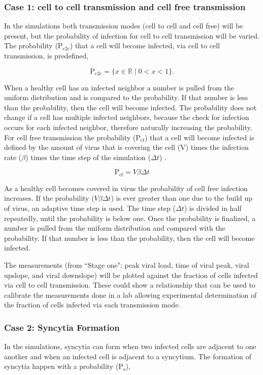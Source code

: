\documentclass[a4paper]{article}
\begin{document}
\subsubsection{Case 1: cell to cell transmission and cell free transmission}
In the simulations both transmission modes (cell to cell and cell free) will be present, but the probability of infection for cell to cell transmission will be varied. The probability ($\mathrm{P_{c2c}}$) that a cell will become infected, via cell to cell transmission, is predefined,

$$\mathrm{P_{c2c}} = \{x \in \mathbb{R} \mid 0<x<1\}.$$

\noindent
When a healthy cell has an infected neighbor a number is pulled from the uniform distribution and is compared to the probability. If that number is less than the probability, then the cell will become infected. The probability does not change if a cell has multiple infected neighbors, because the check for infection occurs for each infected neighbor, therefore naturally increasing the probability. For cell free transmission the probability ($\mathrm{P_{cf}}$) that a cell will become infected is defined by the amount of virus that is covering the cell (V) times the infection rate ($\beta$) times the time step of the simulation ($\Delta t$) \cite{Holder}.

$$\mathrm{P_{cf}} = V \beta \Delta t$$ 

\noindent
As a healthy cell becomes covered in virus the probability of cell free infection increases. If the probability ($V \beta \Delta t$) is ever greater than one due to the build up of virus, an adaptive time step is used. The time step ($\Delta t$) is divided in half repeatedly, until the probability is below one. Once the probability is finalized, a number is pulled from the uniform distribution and compared with the probability. If that number is less than the probability, then the cell will become infected.

The measurements (from ``Stage one": peak viral load, time of viral peak, viral upslope, and viral downslope) will be plotted against the fraction of cells infected via cell to cell transmission. These could show a relationship that can be used to calibrate the measurements done in a lab allowing experimental determination of the fraction of cells infected via each transmission mode.

\subsubsection{Case 2: Syncytia Formation}
In the simulations, syncytia can form when two infected cells are adjacent to one another and when an infected cell is adjacent to a syncytium. The formation of syncytia happen with a probability ($\mathrm{P_{s}}$),
\end{document}
